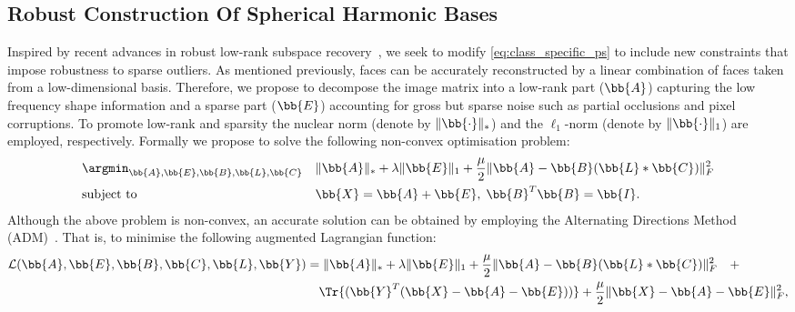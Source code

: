 \subsection{Robust Construction Of Spherical Harmonic Bases}\label{subsec:imag_coll_robust_sh_basis}
Inspired by recent advances in robust low-rank subspace
recovery~\cite{candes2011robust}, we seek to modify \cref{eq:class_specific_ps} to
include new constraints that impose robustness to sparse outliers.
As mentioned previously, faces
can be accurately reconstructed by a linear combination of faces taken from a
low-dimensional basis. Therefore, we propose to decompose the image matrix into
a low-rank part ($\bb{A}$) capturing the low frequency shape information and a
sparse part ($\bb{E}$) accounting for gross but sparse noise such as partial
occlusions and pixel corruptions. To promote low-rank and sparsity the nuclear
norm (denote by $\lVert \bb{\cdot} \rVert_{*}$) and the $\ell_1$-norm (denote by
$\lVert \bb{\cdot} \rVert_{1}$) are employed, respectively. Formally we propose
to solve the following non-convex optimisation problem:
\begin{equation}
\begin{aligned}
    &\argmin_{\bb{A},\bb{E},\bb{B},\bb{L},\bb{C}} & &\lVert \bb{A} \rVert_{*} + \lambda \lVert \bb{E} \rVert_{1} + \frac{\mu}{2} \lVert \bb{A} - \bb{B} (\bb{L} \ast \bb{C}) \rVert^{2}_{F} \\
    & \text{subject to} & & \bb{X} = \bb{A} + \bb{E}, \; \bb{B}^T \bb{B} = \bb{I}.
\end{aligned}
\label{eq:robust_sh_problem}
\end{equation}
Although the above problem is non-convex, an accurate solution can be obtained
by employing the Alternating Directions Method (ADM)~\cite{bertsekas2014constrained}. That
is, to minimise the following augmented Lagrangian function:
\begin{equation}
    \begin{aligned}
        \mathcal{L}(\bb{A},\bb{E},\bb{B},\bb{C},\bb{L},\bb{Y}) &= \lVert \bb{A} \rVert_{*} + \lambda \lVert \bb{E} \rVert_{1} + \frac{\mu}{2} \lVert \bb{A} - \bb{B} (\bb{L} \ast \bb{C}) \rVert^{2}_{F} \quad + \\
        & \quad \Tr{(\bb{Y}^T(\bb{X} - \bb{A} - \bb{E}))} +  \frac{\mu}{2} \lVert \bb{X} - \bb{A} - \bb{E} \rVert_{F}^{2},
    \end{aligned}\label{eq:augmented_lagrangian}
\end{equation}
